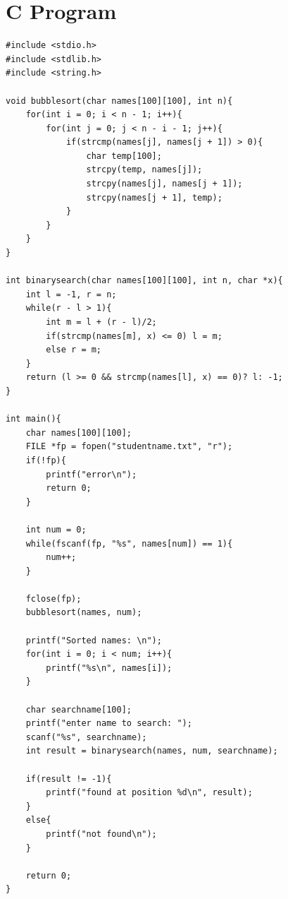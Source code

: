\section{C Program}
\begin{lstlisting}[label={list:c_program:file_binary_search}]
#include <stdio.h>
#include <stdlib.h>
#include <string.h>

void bubblesort(char names[100][100], int n){
    for(int i = 0; i < n - 1; i++){
        for(int j = 0; j < n - i - 1; j++){
            if(strcmp(names[j], names[j + 1]) > 0){
                char temp[100];
                strcpy(temp, names[j]);
                strcpy(names[j], names[j + 1]);
                strcpy(names[j + 1], temp);
            }
        }
    }
}

int binarysearch(char names[100][100], int n, char *x){
    int l = -1, r = n;
    while(r - l > 1){
        int m = l + (r - l)/2;
        if(strcmp(names[m], x) <= 0) l = m;
        else r = m;
    }
    return (l >= 0 && strcmp(names[l], x) == 0)? l: -1;
}

int main(){
    char names[100][100];
    FILE *fp = fopen("studentname.txt", "r");
    if(!fp){
        printf("error\n");
        return 0;
    }

    int num = 0;
    while(fscanf(fp, "%s", names[num]) == 1){
        num++;
    }
     
    fclose(fp);
    bubblesort(names, num);

    printf("Sorted names: \n");
    for(int i = 0; i < num; i++){
        printf("%s\n", names[i]);
    }

    char searchname[100];
    printf("enter name to search: ");
    scanf("%s", searchname);
    int result = binarysearch(names, num, searchname); 

    if(result != -1){
        printf("found at position %d\n", result);
    }
    else{
        printf("not found\n");
    }

    return 0;
}

\end{lstlisting}

